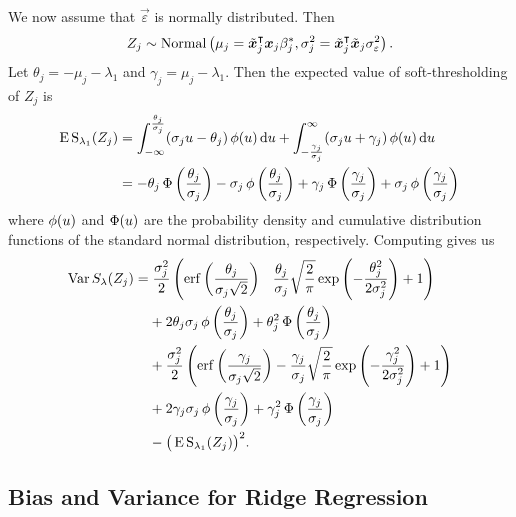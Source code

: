 We now assume that \(\vec{\varepsilon}\) is normally distributed. Then
\[
  {Z_j} \sim \operatorname{Normal}\left(\mu_j = \tilde{\bm{x}}_j^\intercal\bm{x}_j \beta_j^*, \sigma_j^2 = \tilde{\bm{x}}_j^\intercal\tilde{\bm{x}}_j \sigma_\varepsilon^2 \right).
\]
Let \(\theta_j = -\mu_j -\lambda_1 \) and \(\gamma_j = \mu_j - \lambda_1\). Then the
expected value of soft-thresholding of \({Z_j}\) is
\begin{align*}
  \operatorname{E} \operatorname{S}_{\lambda_1}({Z_j}) & = \int_{-\infty}^\frac{\theta_j}{\sigma_j} (\sigma_j u - \theta_j) \operatorname{\phi}(u) \mathop{}\!\mathrm{d} u + \int_{-\frac{\gamma_j}{\sigma_j}}^\infty (\sigma_j u + \gamma_j) \operatorname{\phi}(u) \mathop{}\!\mathrm{d} u                                               \nonumber \\
                            & = -\theta_j \operatorname{\Phi}\left(\frac{\theta_j}{\sigma_j}\right) - \sigma_j \operatorname{\phi}\left(\frac{\theta_j}{\sigma_j}\right) + \gamma_j \operatorname{\Phi}\left(\frac{\gamma_j}{\sigma_j}\right) + \sigma_j \operatorname{\phi}\left(\frac{\gamma_j}{\sigma_j}\right)
\end{align*}
where \(\operatorname{\phi}(u)\) and \(\operatorname{\Phi}(u)\) are the probability density and cumulative distribution
functions of the standard normal distribution, respectively. Computing  gives us
\begin{align*}
  \var{S_\lambda(Z_j)} & = \frac{\sigma_j^2}{2} \left( \erf\left(\frac{\theta_j}{\sigma_j\sqrt{2}}\right) \phantom{-{}} \frac{\theta_j}{\sigma_j}\sqrt{\frac{2}{\pi}} \exp\left(-\frac{\theta_j^2}{2\sigma_j^2}\right) + 1 \right)  \nonumber  \\
                       & \phantom{={}} + 2 \theta_j \sigma_j \pdf \left(\frac{\theta_j}{\sigma_j}\right) + \theta_j^2 \cdf\left(\frac{\theta_j}{\sigma_j}\right) \nonumber                                                                     \\
                       & \phantom{={}} + \frac{\sigma_j^2}{2} \left( \erf\left(\frac{\gamma_j}{\sigma_j\sqrt{2}}\right) - \frac{\gamma_j}{\sigma_j}\sqrt{\frac{2}{\pi}} \exp\left(-\frac{\gamma_j^2}{2\sigma_j^2}\right) + 1 \right) \nonumber \\
                       & \phantom{={}} + 2 \gamma_j \sigma_j \pdf \left(\frac{\gamma_j}{\sigma_j}\right) + \gamma_j^2 \cdf\left(\frac{\gamma_j}{\sigma_j}\right) \nonumber                                                                     \\
                       & \phantom{={}} - \big(\E \st_{\lambda_1}({Z_j})\big)^2.
\end{align*}

\subsection{Bias and Variance for Ridge Regression}%
\label{sec:ridge-variance}

